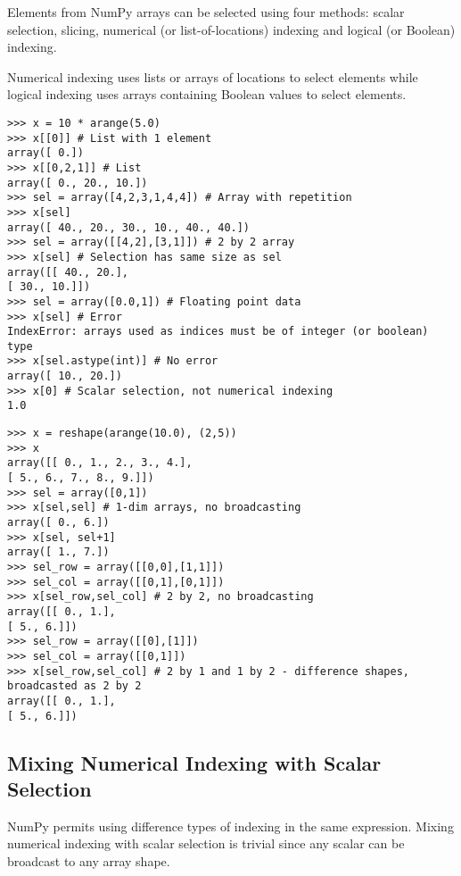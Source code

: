 \documentclass[KSmain.tex]{subfiles}
\begin{document}
 

Elements from NumPy arrays can be selected using four methods: scalar selection, slicing, numerical (or
list-of-locations) indexing and logical (or Boolean) indexing.

Numerical indexing uses lists or arrays of locations
to select elements while logical indexing uses arrays containing Boolean values to select elements.


\begin{framed}
\begin{verbatim}
>>> x = 10 * arange(5.0)
>>> x[[0]] # List with 1 element
array([ 0.])
>>> x[[0,2,1]] # List
array([ 0., 20., 10.])
>>> sel = array([4,2,3,1,4,4]) # Array with repetition
>>> x[sel]
array([ 40., 20., 30., 10., 40., 40.])
>>> sel = array([[4,2],[3,1]]) # 2 by 2 array
>>> x[sel] # Selection has same size as sel
array([[ 40., 20.],
[ 30., 10.]])
>>> sel = array([0.0,1]) # Floating point data
>>> x[sel] # Error
IndexError: arrays used as indices must be of integer (or boolean) type
>>> x[sel.astype(int)] # No error
array([ 10., 20.])
>>> x[0] # Scalar selection, not numerical indexing
1.0

\end{verbatim}
\end{framed}


\begin{framed}
\begin{verbatim}
>>> x = reshape(arange(10.0), (2,5))
>>> x
array([[ 0., 1., 2., 3., 4.],
[ 5., 6., 7., 8., 9.]])
>>> sel = array([0,1])
>>> x[sel,sel] # 1-dim arrays, no broadcasting
array([ 0., 6.])
>>> x[sel, sel+1]
array([ 1., 7.])
>>> sel_row = array([[0,0],[1,1]])
>>> sel_col = array([[0,1],[0,1]])
>>> x[sel_row,sel_col] # 2 by 2, no broadcasting
array([[ 0., 1.],
[ 5., 6.]])
>>> sel_row = array([[0],[1]])
>>> sel_col = array([[0,1]])
>>> x[sel_row,sel_col] # 2 by 1 and 1 by 2 - difference shapes, broadcasted as 2 by 2
array([[ 0., 1.],
[ 5., 6.]])
\end{verbatim}
\end{framed}
\subsection{Mixing Numerical Indexing with Scalar Selection}
NumPy permits using difference types of indexing in the same expression. Mixing numerical indexing
with scalar selection is trivial since any scalar can be broadcast to any array shape.
\end{document}
